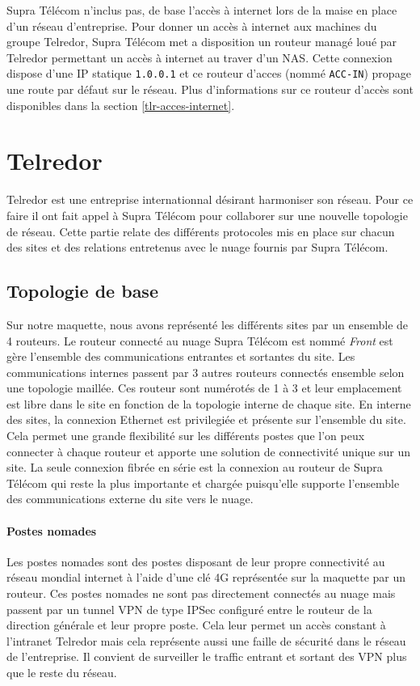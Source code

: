 \documentclass{article}
\newcommand{\tlr}{Telredor\xspace}
\newcommand{\spr}{Supra Télécom\xspace}
\begin{document}
\spr n'inclus pas, de base l'accès à internet lors de la maise en place d'un réseau d'entreprise.
Pour donner un accès à internet aux machines du groupe \tlr, \spr met a disposition un routeur managé loué par \tlr permettant un accès à internet au traver d'un NAS.
Cette connexion dispose d'une IP statique \texttt{1.0.0.1} et ce routeur d'acces (nommé \texttt{ACC-IN}) propage une route par défaut sur le réseau.
Plus d'informations sur ce routeur d'accès sont disponibles dans la section \ref{tlr-acces-internet}.

\section{\tlr}

\tlr est une entreprise internationnal désirant harmoniser son réseau.
Pour ce faire il ont fait appel à \spr pour collaborer sur une nouvelle topologie de réseau.
Cette partie relate des différents protocoles mis en place sur chacun des sites et des relations entretenus avec le nuage fournis par \spr.

\subsection{Topologie de base}

Sur notre maquette, nous avons représenté les différents sites par un ensemble de 4 routeurs.
Le routeur connecté au nuage \spr est nommé \emph{Front} est gère l'ensemble des communications entrantes et sortantes du site.
Les communications internes passent par 3 autres routeurs connectés ensemble selon une topologie maillée.
Ces routeur sont numérotés de 1 à 3 et leur emplacement est libre dans le site en fonction de la topologie interne de chaque site.
En interne des sites, la connexion Ethernet est privilegiée et présente sur l'ensemble du site.
Cela permet une grande flexibilité sur les différents postes que l'on peux connecter à chaque routeur et apporte une solution de connectivité unique sur un site.
La seule connexion fibrée en série est la connexion au routeur de \spr qui reste la plus importante et chargée puisqu'elle supporte l'ensemble des communications externe du site vers le nuage.

\paragraph{Postes nomades} Les postes nomades sont des postes disposant de leur propre connectivité au réseau mondial internet à l'aide d'une clé 4G représentée sur la maquette par un routeur.
Ces postes nomades ne sont pas directement connectés au nuage mais passent par un tunnel VPN de type IPSec configuré entre le routeur de la direction générale et leur propre poste.
Cela leur permet un accès constant à l'intranet \tlr mais cela représente aussi une faille de sécurité dans le réseau de l'entreprise.
Il convient de surveiller le traffic entrant et sortant des VPN plus que le reste du réseau.
\end{document}
